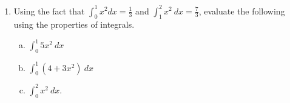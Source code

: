 \documentclass[11pt,fleqn]{article}
\renewcommand{\d}{\displaystyle}
\begin{document}
\begin{enumerate}
\item  Using the fact that $\d \int_0^1 x^2 dx = \frac 1 3$ and $\d \int_{1}^{2} x^{2}\ dx = \frac{7}{3}$,
evaluate the following using the properties of integrals. 

  \begin{multicols}{3}{
      \vspace*{-0.45in}
      \begin{enumerate}[(a)]
      \item $\d \int_0^1 5x^2\  dx$
      \item $\d \int_0^1 ( 4 + 3x^2)\ dx$
       \item $\d \int_0^2 x^{2}\ dx$. 
      \end{enumerate}}
  \end{multicols}
\vfill
\end{enumerate}
\end{document}

